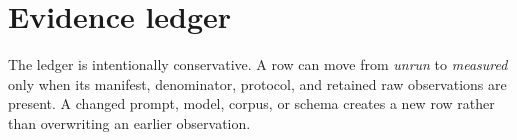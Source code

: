 \section{Evidence ledger}



The ledger is intentionally conservative. A row can move from \emph{unrun} to
\emph{measured} only when its manifest, denominator, protocol, and retained raw
observations are present. A changed prompt, model, corpus, or schema creates a
new row rather than overwriting an earlier observation.
